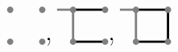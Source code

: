 \begin{align*}
{\begin{tikzpicture}[baseline=2.5ex]
    \fill[gray] (0,0) circle (0.1) (1,0) circle (0.1) (0,1) circle (0.1) (1,1) circle (0.1);
    \node at (1.2,0) {\Huge ,};
  \end{tikzpicture}
  \begin{tikzpicture}[baseline=2.5ex]
    \draw[line width=2, gray!100] (-0.5,1)--(0,1)--(0,0);
    \draw[line width=2] (0,0)--(1,0) (0,1)--(1,1);
%
    \fill[gray] (0,0) circle (0.1) (1,0) circle (0.1) (0,1) circle (0.1) (1,1) circle (0.1);
    \node at (1.2,0) {\Huge ,};
  \end{tikzpicture}
  \begin{tikzpicture}[baseline=2.5ex]
    \draw[line width=2, gray!100] (-0.5,1)--(0,1)--(0,0);
    \draw[line width=2] (0,0)--(1,0)--(1,1)--(0,1);
%
    \fill[gray] (0,0) circle (0.1) (1,0) circle (0.1) (0,1) circle (0.1) (1,1) circle (0.1);
  \end{tikzpicture}
  }
\end{align*}